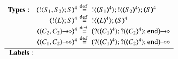 \begin{figure}[t]
\small
\[
\begin{array}{rcl}
{\bf Types:} \quad 		\tmap{\btout{S_1, S_2}S}{4}
		&\!\!\!\!\defeq\!\!\!\!&
		\btout{\tmap{S_1}{4}}  \btout{\tmap{S_2}{4}}\tmap{S}{4}
		\\
		\tmap{\bbtout{L} S}{4}
		&\!\!\!\!\defeq\!\!\!\!&
		\bbtout{\mapt{L}^{4}}\mapt{S}^{4}
		\\
		\tmap{\shot{(C_2,  C_2)}}{4}
		&\!\!\!\!\defeq\!\!\!\!&
		\shot{\big(\btinp{\tmap{C_1}{4}}  \btinp{\tmap{C_2}{4}}\tinact\big)}
		\\
		\tmap{\lhot{(C_1,  C_2)}}{4}
		&\!\!\!\!\defeq\!\!\!\!&
		\lhot{\big(\btinp{\tmap{C_1}{4}}  \btinp{\tmap{C_2}{4}}\tinact\big)}
		\\[1mm]
\hline
{\bf Labels:}\hspace{2.2cm}\\

\end{array}\]
\end{figure}
